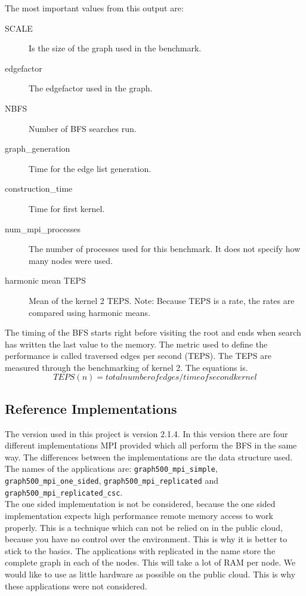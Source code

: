 The most important values from this output are:
\begin{description}
\item[SCALE] Is the size of the graph used in the benchmark.
\item[edgefactor] The edgefactor used in the graph.
\item[NBFS] Number of BFS searches run.
\item[graph\_generation] Time for the edge list generation.
\item[construction\_time] Time for first kernel.
\item[num\_mpi\_processes] The number of processes used for this benchmark. It does not specify how many nodes were used.
\item[harmonic mean TEPS] Mean  of the kernel 2 TEPS. Note: Because TEPS is a rate, the rates are compared using harmonic means\cite{harmonic_mean}.
\end{description}

The timing of the BFS starts right before visiting the root and ends when search has written the last value to the memory. The metric used to define the performance is called traversed edges per second (TEPS). The TEPS are measured through the benchmarking of kernel 2. The equations is.
\begin{equation}
TEPS(n) = total number of edges / time of second kernel
\end{equation}




\subsection{Reference Implementations}

The version used in this project is version 2.1.4\cite{graph500-code}. In this version there are four different implementations MPI provided which all perform the BFS in the same way. The differences between the implementations are the data structure used. The names of the applications are: \texttt{graph500\_mpi\_simple}, \texttt{graph500\_mpi\_one\_sided}, \texttt{graph500\_mpi\_replicated} and \texttt{graph500\_mpi\_replicated\_csc}.
\\ 
The one sided implementation is not be considered, because the one sided implementation expects high performance remote memory access to work properly. This is a technique which can not be relied on in the public cloud, because you have no control over the environment. This is why it is better to stick to the basics. The applications with replicated in the name store the complete graph in each of the nodes. This will take a lot of RAM per node. We would like to use as little hardware as possible on the public cloud. This is why these applications were not considered.

